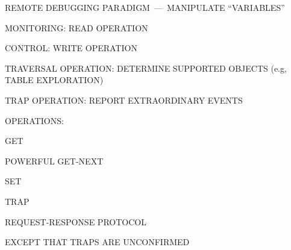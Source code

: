 \begin{bwslide}

\begin{nrtc}
\item	REMOTE DEBUGGING PARADIGM~---~MANIPULATE ``VARIABLES''
    \begin{nrtc}
    \item	MONITORING: READ OPERATION

    \item	CONTROL: WRITE OPERATION
    \end{nrtc}

\item	TRAVERSAL OPERATION: DETERMINE SUPPORTED OBJECTS
	(e.g, TABLE EXPLORATION)

\item	TRAP OPERATION: REPORT EXTRAORDINARY EVENTS
\end{nrtc}
\end{bwslide}


\begin{bwslide}

\begin{nrtc}
\item	OPERATIONS:
    \begin{nrtc}
    \item	GET

    \item	POWERFUL GET-NEXT

    \item	SET

    \item	TRAP
    \end{nrtc}

\item	REQUEST-RESPONSE PROTOCOL
    \begin{nrtc}
    \item	EXCEPT THAT TRAPS ARE UNCONFIRMED
    \end{nrtc}
\end{nrtc}
\end{bwslide}


